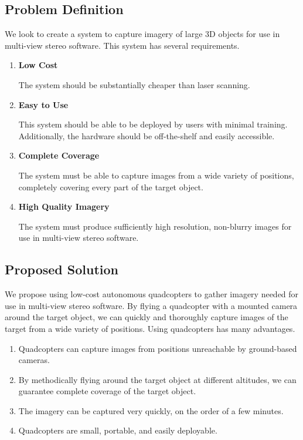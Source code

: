 \documentclass[pageno]{jpaper}
\begin{document}
\subsection{Problem Definition}
We look to create a system to capture imagery of large 3D objects for use in multi-view stereo software. This system has several requirements.

\begin{enumerate}
\item
\textbf{Low Cost}

The system should be substantially cheaper than laser scanning.

\item
\textbf{Easy to Use}

This system should be able to be deployed by users with minimal training. Additionally, the hardware should be off-the-shelf and easily accessible.

\item
\textbf{Complete Coverage}

The system must be able to capture images from a wide variety of positions, completely covering every part of the target object.

\item
\textbf{High Quality Imagery}

The system must produce sufficiently high resolution, non-blurry images for use in multi-view stereo software.

\end{enumerate}

\subsection{Proposed Solution}

We propose using low-cost autonomous quadcopters to gather imagery needed for use in multi-view stereo software. By flying a quadcopter with a mounted camera around the target object, we can quickly and thoroughly capture images of the target from a wide variety of positions. Using quadcopters has many advantages.

\begin{enumerate}
\item
Quadcopters can capture images from positions unreachable by ground-based cameras.

\item
By methodically flying around the target object at different altitudes, we can guarantee complete coverage of the target object.

\item
The imagery can be captured very quickly, on the order of a few minutes.

\item
Quadcopters are small, portable, and easily deployable.


\end{enumerate}
\end{document}
